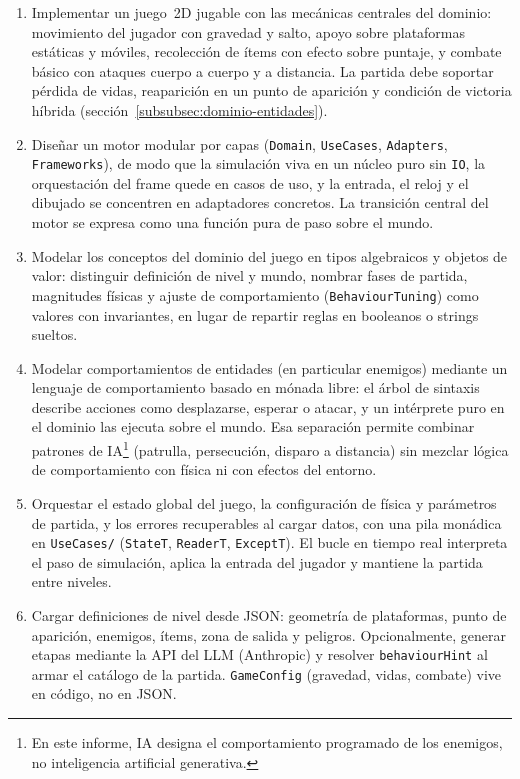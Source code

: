 \begin{enumerate}
  \item Implementar un juego~2D jugable con las mecánicas centrales del dominio: movimiento
    del jugador con gravedad y salto, apoyo sobre plataformas estáticas y móviles,
    recolección de ítems con efecto sobre puntaje, y combate básico con ataques
    cuerpo a cuerpo y a distancia. La partida debe soportar pérdida de vidas,
    reaparición en un punto de aparición y condición de victoria híbrida
    (sección~\ref{subsubsec:dominio-entidades}).

  \item Diseñar un motor modular por capas (\texttt{Domain}, \texttt{UseCases},
    \texttt{Adapters}, \texttt{Frameworks}), de modo que la simulación viva en un núcleo
    puro sin \texttt{IO}, la orquestación del frame quede en casos de uso, y la
    entrada, el reloj y el dibujado se concentren en adaptadores concretos. La transición
    central del motor se expresa como una función pura de paso sobre el mundo.

  \item Modelar los conceptos del dominio del juego en tipos algebraicos y objetos de valor:
    distinguir definición de nivel y mundo, nombrar fases de partida, magnitudes físicas y
    ajuste de comportamiento (\texttt{BehaviourTuning}) como valores con invariantes, en
    lugar de repartir reglas en booleanos o strings sueltos.

  \item Modelar comportamientos de entidades (en particular enemigos) mediante un
    lenguaje de comportamiento basado en mónada libre: el árbol de sintaxis describe
    acciones como desplazarse, esperar o atacar, y un intérprete puro en el dominio las ejecuta
    sobre el mundo. Esa separación permite combinar patrones de IA\footnote{En
    este informe, IA designa el comportamiento programado de los enemigos, no
    inteligencia artificial generativa.} (patrulla,
    persecución, disparo a distancia) sin mezclar lógica de comportamiento con física ni con
    efectos del entorno.

  \item Orquestar el estado global del juego, la configuración de física y parámetros de
    partida, y los errores recuperables al cargar datos, con una pila monádica en
    \texttt{UseCases/} (\texttt{StateT}, \texttt{ReaderT}, \texttt{ExceptT}). El bucle en
    tiempo real interpreta el paso de simulación, aplica la entrada del jugador y
    mantiene la partida entre niveles.

  \item Cargar definiciones de nivel desde JSON: geometría de plataformas,
    punto de aparición, enemigos, ítems, zona de salida y peligros.
    Opcionalmente, generar etapas mediante la API del LLM (Anthropic) y resolver
    \texttt{behaviourHint} al armar el catálogo de la partida. \texttt{GameConfig}
    (gravedad, vidas, combate) vive en
    código, no en JSON.
\end{enumerate}


